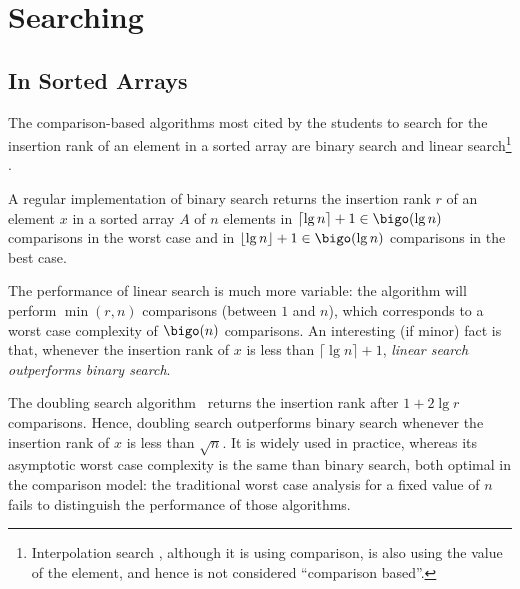 

\chapter{Searching}
\label{cha:adapt-analys-search}


\section{In Sorted Arrays}
\label{sec:sorted-arrays-using}


The comparison-based algorithms most cited by the students to search
for the insertion rank   of an element in a sorted array  are
binary search  and linear
search\footnote{Interpolation search ,
  although it is using comparison, is also using the value of the
  element, and hence is not considered ``comparison based''.}
.

A regular implementation of binary search returns the insertion rank
$r$ of an element $x$ in a sorted array $A$ of $n$ elements in
$\lceil\lg n\rceil+1\in\bigo(\lg n)$ comparisons in the worst case and
in $\lfloor\lg n\rfloor+1\in\bigo(\lg n)$ comparisons in the best case.


The performance of linear search is much more variable: the algorithm
will perform $\min(r,n)$ comparisons (between $1$ and $n$), which
corresponds to a worst case complexity of $\bigo(n)$ comparisons.
%
An interesting (if minor) fact is that, whenever the insertion rank of
$x$ is less than $\lceil\lg n\rceil+1$, {\em linear search outperforms
  binary search}.

The doubling search algorithm~\cite{anAlmostOptimalAlgorithmForUnboundedSearching,unboundedSearchingAlgorithms,moreNearlyOptimalAlgorithmsForUnboundedSearchingI,moreNearlyOptimalAlgorithmsForUnboundedSearchingII}
returns the insertion rank after $1+2\lg r$ comparisons.
%
Hence, doubling search outperforms binary search whenever the
insertion rank of $x$ is less than $\sqrt{n}$.
%
It is widely used in practice, whereas its asymptotic worst case
complexity is the same than binary search, both optimal in the
comparison model: the traditional worst case analysis for a fixed
value of $n$ fails to distinguish the performance of those algorithms.



